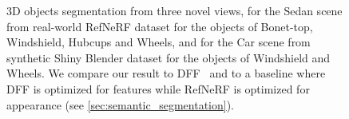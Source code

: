 \begin{figure}[ht!]
\begin{tabular}{c@{}c@{}c@{}c}
\end{tabular}
\vspace{-0.3cm}
\caption{3D objects segmentation from three novel views, for the Sedan scene from real-world RefNeRF \cite{verbin2022refnerf} dataset for the objects of Bonet-top, Windshield, Hubcups and Wheels, and for the Car scene from synthetic Shiny Blender \cite{verbin2022refnerf} dataset for the objects of Windshield and Wheels. We compare our result to DFF~\cite{kobayashi2022decomposing} and to a baseline where DFF is optimized for features while RefNeRF is optimized for appearance (see \cref{sec:semantic_segmentation}).} 

\label{fig:segmentation}
\vspace{-0.3cm}
\end{figure}








